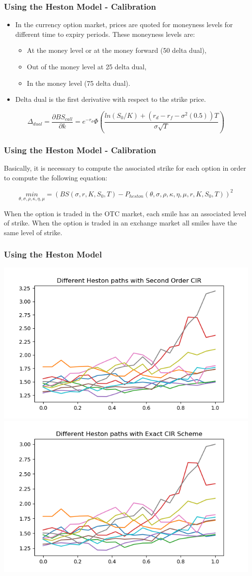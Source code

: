 \documentclass[12pt]{beamer}
\begin{document}
\begin{frame}
\frametitle{Using the Heston Model - Calibration}
\begin{itemize}
  \item In the currency option market, prices are quoted for moneyness levels for different time to expiry periods. These moneyness levels are:
  \begin{itemize}
    \item At the money level or at the money forward (50 delta dual),
    \item Out of the money level at 25 delta dual,
    \item In the money level (75 delta dual).
  \end{itemize}
  \item Delta dual is the first derivative with respect to the strike price.
\end{itemize}
$$\Delta_{dual}=\frac{\partial BS_{call}}{\partial k}=e^{-r_{d}}\Phi \left(\frac{ln(S_{0}/K)+(r_{d}-r_{f}-\sigma^{2}(0.5))T}{\sigma \sqrt T}\right)$$
\end{frame}


\begin{frame}
\frametitle{Using the Heston Model - Calibration}
Basically, it is necessary to compute the associated strike for each option in order to compute the following equation:

$$\underset{\theta,\sigma,\rho,\kappa,\eta,\mu}{min}=(BS(\sigma,r,K,S_{0},T)-P_{heston}(\theta,\sigma,\rho,\kappa,\eta,\mu,r,K,S_{0},T))^2$$

When the option is traded in the OTC market, each smile has an associated level of strike. When the option is traded in an exchange market all smiles have the same level of strike.
\end{frame}

\begin{frame}
\frametitle{Using the Heston Model}
\includegraphics[width=.5\textwidth]{heston_cir220.png}
\includegraphics[width=.5\textwidth]{heston_exact20.png}
\end{frame}
\end{document}

